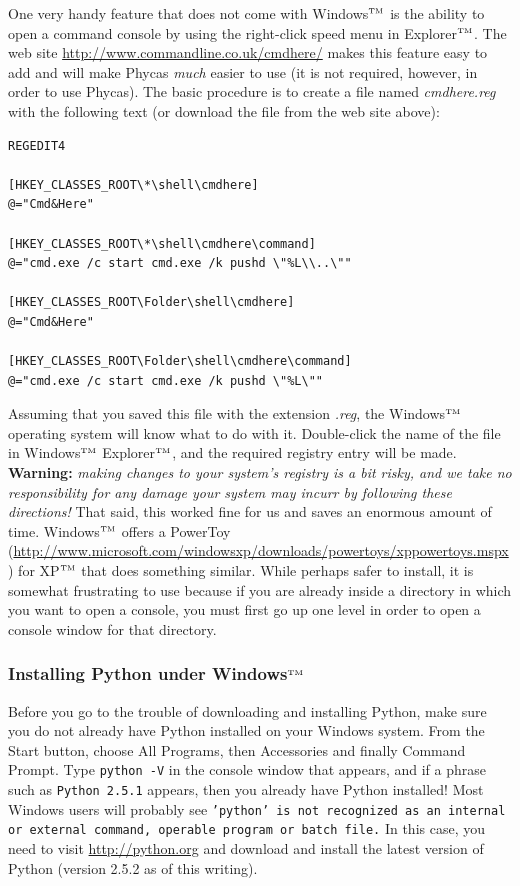 \documentclass[10pt]{article}
\newcommand{\trademark}[1]{#1${}^{\mbox{\tiny TM}}$}
\newcommand{\pathname}[1]{{\em #1}}			%
\newcommand{\menu}[1]{{\sf #1}}				%
\newcommand{\code}[1]{{\tt #1}}				%
\begin{document}
One very handy feature that does not come with \trademark{Windows} is the ability to open a command console by using the right-click speed menu in \trademark{Explorer}. The web site \url{http://www.commandline.co.uk/cmdhere/} makes this feature easy to add and will make Phycas {\em much} easier to use (it is not required, however, in order to use Phycas). The basic procedure is to create a file named \pathname{cmdhere.reg} with the following text (or download the file from the web site above):
%
\begin{verbatim}
REGEDIT4

[HKEY_CLASSES_ROOT\*\shell\cmdhere]
@="Cmd&Here"

[HKEY_CLASSES_ROOT\*\shell\cmdhere\command]
@="cmd.exe /c start cmd.exe /k pushd \"%L\\..\""

[HKEY_CLASSES_ROOT\Folder\shell\cmdhere]
@="Cmd&Here"

[HKEY_CLASSES_ROOT\Folder\shell\cmdhere\command]
@="cmd.exe /c start cmd.exe /k pushd \"%L\""
\end{verbatim}
%
Assuming that you saved this file with the extension \pathname{.reg}, the \trademark{Windows} operating system will know what to do with it. Double-click the name of the file in \trademark{Windows} \trademark{Explorer}, and the required registry entry will be made. {\bfseries Warning:} {\em making changes to your system's registry is a bit risky, and we take no responsibility for any damage your system may incurr by following these directions!} That said, this worked fine for us and saves an enormous amount of time. \trademark{Windows} offers a PowerToy (\url{http://www.microsoft.com/windowsxp/downloads/powertoys/xppowertoys.mspx}) for \trademark{XP} that does something similar. While perhaps safer to install, it is somewhat frustrating to use because if you are already inside a directory in which you want to open a console, you must first go up one level in order to open a console window for that directory.

\subsubsection{Installing Python under \trademark{Windows}}

Before you go to the trouble of downloading and installing Python, make sure you do not already have Python installed on your Windows system. From the Start button, choose \menu{All Programs}, then \menu{Accessories} and finally \menu{Command Prompt}. Type \code{python -V} in the console window that appears, and if a phrase such as \code{Python 2.5.1} appears, then you already have Python installed! Most Windows users will probably see \code{'python' is not recognized as an internal or external command, operable program or batch file.} In this case, you need to visit \url{http://python.org} and download and install the latest version of Python (version 2.5.2 as of this writing).
\end{document}
